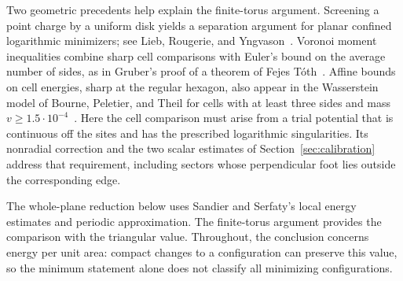 Two geometric precedents help explain the finite-torus argument.
Screening a point charge by a uniform disk yields a separation argument
for planar confined logarithmic minimizers; see
Lieb, Rougerie, and Yngvason~\cite[Lemma~3 and Appendix~A]{LiebRougerieYngvason2018}.
Voronoi moment inequalities combine sharp cell comparisons with Euler's
bound on the average number of sides, as in Gruber's proof of a theorem
of Fejes T\'oth~\cite{Gruber1999}. Affine bounds on cell energies, sharp
at the regular hexagon, also appear in the Wasserstein model of
Bourne, Peletier, and Theil for cells with at least three sides and mass
$v\ge1.5\cdot10^{-4}$~\cite[Lemma~12]{BournePeletierTheil2014}.
Here the cell comparison must arise from a trial potential that is
continuous off the sites and has the prescribed logarithmic
singularities. Its nonradial correction and
the two scalar estimates of Section~\ref{sec:calibration} address that
requirement, including sectors whose perpendicular foot lies outside
the corresponding edge.

The whole-plane reduction below uses Sandier and Serfaty's local energy
estimates and periodic approximation. The finite-torus argument
provides the comparison with the triangular value. Throughout, the
conclusion concerns energy per unit area: compact changes to a
configuration can preserve this value, so the minimum statement alone
does not classify all minimizing configurations.
